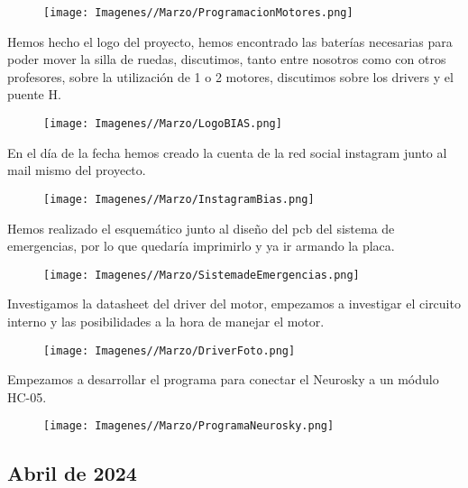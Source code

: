 \documentclass{article}
\begin{document}
\begin{figure}[H]
    \centering
    \texttt{[image: Imagenes//Marzo/ProgramacionMotores.png]}
\end{figure}


Hemos hecho el logo del proyecto, hemos encontrado las baterías necesarias para poder mover la silla de ruedas, discutimos, tanto entre nosotros como con otros profesores, sobre la utilización de 1 o 2 motores, discutimos sobre los drivers y el puente H.

\begin{figure}[H]
    \centering
    \texttt{[image: Imagenes//Marzo/LogoBIAS.png]}
\end{figure}

\newpage

En el día de la fecha hemos creado la cuenta  de la red social instagram junto al mail mismo del proyecto.

\begin{figure}[H]
    \centering
    \texttt{[image: Imagenes//Marzo/InstagramBias.png]}
\end{figure}


Hemos realizado el esquemático junto al diseño del pcb del sistema de emergencias, por lo que quedaría imprimirlo y ya ir armando la placa.

\begin{figure}[H]
    \centering
    \texttt{[image: Imagenes//Marzo/SistemadeEmergencias.png]}
\end{figure}

Investigamos la datasheet del driver del motor, empezamos a investigar el circuito interno y las posibilidades a la hora de manejar el motor.

\begin{figure}[H]
    \centering
    \texttt{[image: Imagenes//Marzo/DriverFoto.png]}
\end{figure}

\newpage

Empezamos a desarrollar el programa para conectar el Neurosky a un módulo HC-05.

\begin{figure}[H]
    \centering
    \texttt{[image: Imagenes//Marzo/ProgramaNeurosky.png]}
\end{figure}


\begin{center}
    \section{Abril de 2024}
\end{center}
\end{document}
